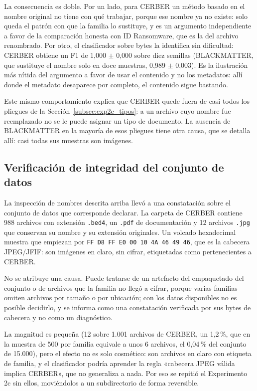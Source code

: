 La consecuencia es doble. Por un lado, para CERBER un método basado en el nombre original no tiene con qué trabajar, porque ese nombre ya no existe: solo queda el patrón con que la familia lo sustituye, y es un argumento independiente a favor de la comparación honesta con ID Ransomware, que es la del archivo renombrado. Por otro, el clasificador sobre bytes la identifica sin dificultad: CERBER obtiene un F1 de 1,000 $\pm$ 0,000 sobre diez semillas (BLACKMATTER, que sustituye el nombre solo en doce muestras, 0,989 $\pm$ 0,003). Es la ilustración más nítida del argumento a favor de usar el contenido y no los metadatos: allí donde el metadato desaparece por completo, el contenido sigue bastando.

Este mismo comportamiento explica que CERBER quede fuera de casi todos los pliegues de la Sección~\ref{subsec:exp2c_tipos}: a un archivo cuyo nombre fue reemplazado no se le puede asignar un tipo de documento. La ausencia de BLACKMATTER en la mayoría de esos pliegues tiene otra causa, que se detalla allí: casi todas sus muestras son imágenes.

\subsection{Verificación de integridad del conjunto de datos}
\label{subsec:exp2c_integridad}

La inspección de nombres descrita arriba llevó a una constatación sobre el conjunto de datos que corresponde declarar. La carpeta de CERBER contiene 988 archivos con extensión \texttt{.bed4}, un \texttt{.pdf} de documentación y 12 archivos \texttt{.jpg} que conservan su nombre y su extensión originales. Un volcado hexadecimal muestra que empiezan por \texttt{FF D8 FF E0 00 10 4A 46 49 46}, que es la cabecera JPEG/JFIF: son imágenes en claro, sin cifrar, etiquetadas como pertenecientes a CERBER.

No se atribuye una causa. Puede tratarse de un artefacto del empaquetado del conjunto o de archivos que la familia no llegó a cifrar, porque varias familias omiten archivos por tamaño o por ubicación; con los datos disponibles no es posible decidirlo, y se informa como una constatación verificada por sus bytes de cabecera y no como un diagnóstico.

La magnitud es pequeña (12 sobre 1.001 archivos de CERBER, un 1,2\,\%, que en la muestra de 500 por familia equivale a unos 6 archivos, el 0,04\,\% del conjunto de 15.000), pero el efecto no es solo cosmético: son archivos en claro con etiqueta de familia, y el clasificador podría aprender la regla «cabecera JPEG válida implica CERBER», que no generaliza a nada. Por eso se repitió el Experimento 2c sin ellos, moviéndolos a un subdirectorio de forma reversible.

